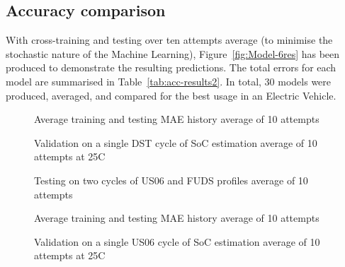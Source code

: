 \subsection{Accuracy comparison}
With cross-training and testing over ten attempts average (to minimise the stochastic nature of the Machine Learning), Figure~\ref{fig:Model-6res} has been produced to demonstrate the resulting predictions.
The total errors for each model are summarised in Table~\ref{tab:acc-results2}.
In total, 30 models were produced, averaged, and compared for the best usage in an Electric Vehicle.
\begin{figure*}[htbp]
    \centering
    \begin{subfigure}[b]{0.325\textwidth}
        \centering
        
        \caption{Average training and testing MAE history average of 10 attempts}
    \end{subfigure}
    \hfill
    \begin{subfigure}[b]{0.325\textwidth}
        \centering
        
        \caption{Validation on a single DST cycle of SoC estimation average of 10 attempts at 25\textdegree{}C}
    \end{subfigure}
    \hfill
    \begin{subfigure}[b]{0.325\textwidth}
        \centering
        
        \caption{Testing on two cycles of US06 and FUDS profiles average of 10 attempts}
        \label{subfig:Model-6res-DSTvsFUDS}
    \end{subfigure}
    \begin{subfigure}[b]{0.325\textwidth}
        \centering
        
        \caption{Average training and testing MAE history average of 10 attempts}
    \end{subfigure}
    \hfill
    \begin{subfigure}[b]{0.325\textwidth}
        \centering
        
        \caption{Validation on a single US06 cycle of SoC estimation average of 10 attempts at 25\textdegree{}C}
    \end{subfigure}
    \hfill
    \begin{subfigure}[b]{0.325\textwidth}
        \centering

\end{subfigure}
\end{figure*}
